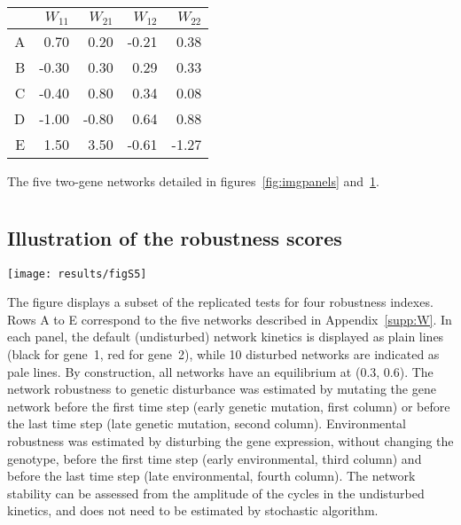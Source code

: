 \documentclass[10pt,a4paper]{article}
\newcommand{\SupMat}{Appendix~}
\begin{document}
\begin{appendices}
	\begin{center}
	\begin{tabular}{rrrrr}
	  \hline
	 & $W_{11}$ & $W_{21}$ & $W_{12}$ & $W_{22}$ \\ 
	  \hline
	  A & 0.70 & 0.20 & -0.21 & 0.38 \\ 
	  B & -0.30 & 0.30 & 0.29 & 0.33 \\ 
	  C & -0.40 & 0.80 & 0.34 & 0.08 \\ 
	  D & -1.00 & -0.80 & 0.64 & 0.88 \\ 
	  E & 1.50 & 3.50 & -0.61 & -1.27 \\ 
	   \hline
	\end{tabular}
	\end{center}
	{\color{Gray} The five two-gene networks detailed in figures~\ref{fig:imgpanels} and~\ref{supp:simpanels}.}

	
  \clearpage
  \section{}
    \label{supp:simpanels}
    \subsection*{Illustration of the robustness scores}

	\begin{adjustwidth}{-1in}{0in}
	\texttt{[image: results/figS5]}

	{\color{Gray} The figure displays a subset of the replicated tests for four robustness indexes. Rows A to E correspond to the five networks described in \SupMat \ref{supp:W}. In each panel, the default (undisturbed) network kinetics is displayed as plain lines (black for gene~1, red for gene~2), while 10 disturbed networks are indicated as pale lines. By construction, all networks have an equilibrium at (0.3, 0.6). The network robustness to genetic disturbance was estimated by mutating the gene network before the first time step (early genetic mutation, first column) or before the last time step (late genetic mutation, second column). Environmental robustness was estimated by disturbing the gene expression, without changing the genotype, before the first time step (early environmental, third column) and before the last time step (late environmental, fourth column). The network stability can be assessed from the amplitude of the cycles in the undisturbed kinetics, and does not need to be estimated by stochastic algorithm.}
	\end{adjustwidth}



\end{appendices}
\end{document}
